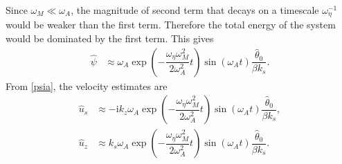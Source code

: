 \documentclass[12pt,psfig]{article}
\begin{document}
Since $\omega_M\ll \omega_A$, the magnitude of second term that decays on a timescale $\omega_\eta^{-1}$ would be weaker than the first term. Therefore the total energy of the system would be dominated by the first term. This gives
\begin{align}
\hat{\psi}&\approx \omega_A \exp\left(-\dfrac{\omega_\eta\omega_M^2}{2\omega_A^2}t\right)\sin(\omega_A t)\dfrac{\hat{\theta}_0}{\beta k_s}.\label{psia}
\end{align}
From \eqref{psia}, the velocity estimates are
\begin{align}
\hat{u}_s&\approx -\mathrm{i}k_z \omega_A \exp\left(-\dfrac{\omega_\eta\omega_M^2}{2\omega_A^2}t\right)\sin(\omega_A t)\dfrac{\hat{\theta}_0}{\beta k_s},\label{uhatsapprox}\\
\hat{u}_z&\approx k_s \omega_A \exp\left(-\dfrac{\omega_\eta\omega_M^2}{2\omega_A^2}t\right)\sin(\omega_A t)\dfrac{\hat{\theta}_0}{\beta k_s}\label{uhatzapprox}.
\end{align}
\end{document}

